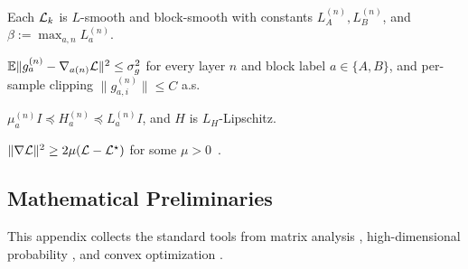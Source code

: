 \begin{assumption}\label{asm:smooth}
Each $\mathcal{L}_k$ is $L$-smooth and block-smooth with constants $L_A^{(n)},L_B^{(n)}$, and $\beta:=\max_{a,n}L_a^{(n)}$.
\end{assumption}
\begin{assumption}\label{asm:var}
$\mathbb{E}\|g_a^{(n)}-\nabla_{a(n)}\mathcal{L}\|^2\le\sigma_g^2$ for every layer $n$ and block label $a\in\{A,B\}$, and per-sample clipping $\|g_{a,i}^{(n)}\|\le C$ a.s.
\end{assumption}
\begin{assumption}\label{asm:hess}
$\mu_a^{(n)}I\preceq H_a^{(n)}\preceq L_a^{(n)} I$, and $H$ is $L_H$-Lipschitz.
\end{assumption}
\begin{assumption}\label{asm:pl}
$\|\nabla\mathcal{L}\|^2\ge 2\mu(\mathcal{L}-\mathcal{L}^\star)$ for some $\mu>0$~\citep{karimi2016pl}.
\end{assumption}





\subsection{Mathematical Preliminaries}


This appendix collects the standard tools from matrix analysis \cite{horn2012matrix}, high-dimensional probability \cite{vershynin2018}, and convex optimization \cite{nesterov2018book}.

